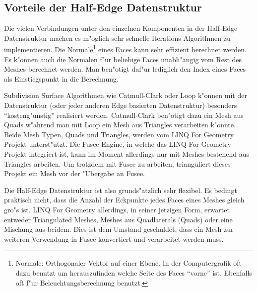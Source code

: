 \documentclass[pagesize, paper=a4, fontsize=12pt,titlepage=true, headings=small, headnosepline, abstractoff, liststotoc, nochapterprefix, plainheadsepline]{scrreprt}
\newcommand{\LFGS}{LINQ For Geometry }
\newcommand{\HES}{Half-Edge Datenstruktur }
\begin{document}
		\subsection {Vorteile der \HES}
			Die vielen Verbindungen unter den einzelnen Komponenten in der \HES machen es m"oglich sehr schnelle Iterations Algorithmen zu implementieren. Die Normale\footnote{Normale: Orthogonaler Vektor auf einer Ebene. In der Computergrafik oft dazu benutzt um herauszufinden welche Seite des Faces "`vorne"' ist. Ebenfalls oft f"ur Beleuchtungsberechnung benutzt.} eines Faces kann sehr effizient berechnet werden. Es k"onnen auch die Normalen f"ur beliebige Faces unabh"angig vom Rest des Meshes berechnet werden. Man ben"otigt daf"ur lediglich den Index eines Faces als Einstiegspunkt in die Berechnung.
\newline

Subdivision Surface Algorithmen wie Catmull-Clark oder Loop k"onnen mit der Datenstruktur (oder jeder anderen Edge basierten Datenstruktur) besonders "`kosteng"unstig"' realisiert werden. Catmull-Clark ben"otigt dazu ein Mesh aus Quads w"ahrend man mit Loop ein Mesh aus Triangles verarbeiten k"onnte. Beide Mesh Typen, Quads und Triangles, werden vom \LFGS Projekt unterst"utzt. Die Fusee Engine, in welche das \LFGS Projekt integriert ist, kann im Moment allerdings nur mit Meshes bestehend aus Triangles arbeiten. Um trotzdem mit Fusee zu arbeiten, trianguliert dieses Projekt ein Mesh vor der "Ubergabe an Fusee.
\newline

Die \HES ist also grunds"atzlich sehr flexibel. Es bedingt praktisch nicht, dass die Anzahl der Eckpunkte jedes Faces eines Meshes gleich gro"s ist. \LFGS allerdings, in seiner jetzigen Form, erwartet entweder Triangulated Meshes, Meshes aus Quadlaterals (Quads) oder eine Mischung aus beidem. Dies ist dem Umstand geschuldet, dass ein Mesh zur weiteren Verwendung in Fusee konvertiert und verarbeitet werden muss.
\end{document}
